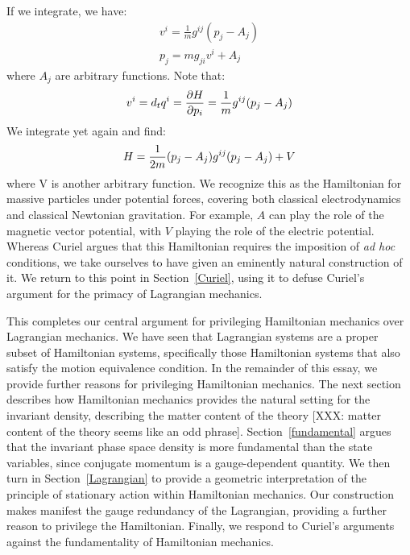 \documentclass[letterpaper]{article}
\begin{document}
If we integrate, we have:
\begin{equation} \label{linear_relationship}
\begin{aligned}
v^i = \frac{1}{m} g^{ij}(p_j - A_j) \\
p_j = m g_{ji} v^i + A_j
\end{aligned}
\end{equation}
where $A_j$ are arbitrary functions. Note that:
\begin{equation}
v^i = d_t q^i = \frac{\partial H }{\partial p_i} = \frac{1}{m} g^{ij}(p_j - A_j) \\
\end{equation}
We integrate yet again and find:
\begin{equation} \label{massive_Hamiltonian}
H = \frac{1}{2m} (p_j - A_j) g^{ij}(p_j - A_j) + V \\
\end{equation}
where V is another arbitrary function. We recognize this as the Hamiltonian for massive particles under potential forces, covering both classical electrodynamics and classical Newtonian gravitation. For example, $A$ can play the role of the magnetic vector potential, with $V$ playing the role of the electric potential. Whereas Curiel \parencites*[]{Curiel} argues that this Hamiltonian requires the imposition of \textit{ad hoc} conditions, we take ourselves to have given an eminently natural construction of it. We return to this point in Section~\ref{Curiel}, using it to defuse Curiel's argument for the primacy of Lagrangian mechanics.

This completes our central argument for privileging Hamiltonian mechanics over Lagrangian mechanics. We have seen that Lagrangian systems are a proper subset of Hamiltonian systems, specifically those Hamiltonian systems that also satisfy the motion equivalence condition. In the remainder of this essay, we provide further reasons for privileging Hamiltonian mechanics. The next section describes how Hamiltonian mechanics provides the natural setting for the invariant density, describing the matter content of the theory [XXX: matter content of the theory seems like an odd phrase]. Section~\ref{fundamental} argues that the invariant phase space density is more fundamental than the state variables, since conjugate momentum is a gauge-dependent quantity. We then turn in Section~\ref{Lagrangian} to provide a geometric interpretation of the principle of stationary action within Hamiltonian mechanics. Our construction makes manifest the gauge redundancy of the Lagrangian, providing a further reason to privilege the Hamiltonian. Finally, we respond to Curiel's arguments against the fundamentality of Hamiltonian mechanics.
\end{document}
